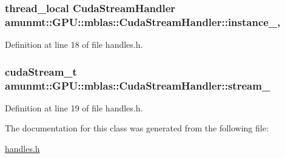 \subsubsection[{\texorpdfstring{instance\+\_\+}{instance_}}]{\setlength{\rightskip}{0pt plus 5cm}thread\+\_\+local {\bf Cuda\+Stream\+Handler} amunmt\+::\+G\+P\+U\+::mblas\+::\+Cuda\+Stream\+Handler\+::instance\+\_\+\hspace{0.3cm}{\ttfamily [static]}, {\ttfamily [protected]}}\hypertarget{classamunmt_1_1GPU_1_1mblas_1_1CudaStreamHandler_a03f35f53a1eb19f8d0ae17b0bced364c}{}\label{classamunmt_1_1GPU_1_1mblas_1_1CudaStreamHandler_a03f35f53a1eb19f8d0ae17b0bced364c}


Definition at line 18 of file handles.\+h.

\subsubsection[{\texorpdfstring{stream\+\_\+}{stream_}}]{\setlength{\rightskip}{0pt plus 5cm}cuda\+Stream\+\_\+t amunmt\+::\+G\+P\+U\+::mblas\+::\+Cuda\+Stream\+Handler\+::stream\+\_\+\hspace{0.3cm}{\ttfamily [protected]}}\hypertarget{classamunmt_1_1GPU_1_1mblas_1_1CudaStreamHandler_aa819c74e84246a768d62788d9be77ed0}{}\label{classamunmt_1_1GPU_1_1mblas_1_1CudaStreamHandler_aa819c74e84246a768d62788d9be77ed0}


Definition at line 19 of file handles.\+h.



The documentation for this class was generated from the following file\+:\begin{DoxyCompactItemize}
\item 
\hyperlink{handles_8h}{handles.\+h}\end{DoxyCompactItemize}
